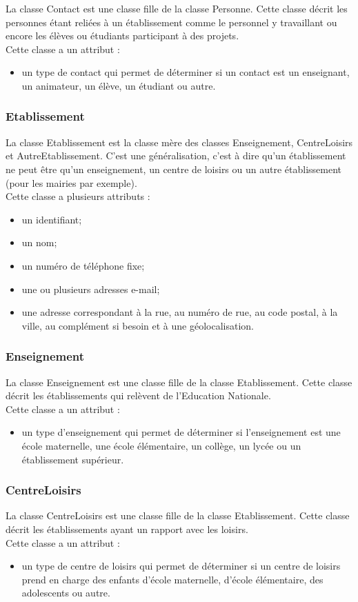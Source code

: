 La classe Contact est une classe fille de la classe Personne. Cette classe décrit les personnes étant reliées à un établissement comme le personnel y travaillant ou encore les élèves ou étudiants participant à des projets. \\
Cette classe a un attribut : 
\begin{itemize}
\item un type de contact qui permet de déterminer si un contact est un enseignant, un animateur, un élève, un étudiant ou autre.
\end{itemize} 

\subsubsection*{Etablissement}

La classe Etablissement est la classe mère des classes Enseignement, CentreLoisirs et AutreEtablissement. C'est une généralisation, c'est à dire qu'un établissement ne peut être qu'un enseignement, un centre de loisirs ou un autre établissement (pour les mairies par exemple).\\
Cette classe a plusieurs attributs : 
\begin{itemize}
\item un identifiant;
\item un nom;
\item un numéro de téléphone fixe;
\item une ou plusieurs adresses e-mail;
\item une adresse correspondant à la rue, au numéro de rue, au code postal, à la ville, au complément si besoin et à une géolocalisation.
\end{itemize}

\subsubsection*{Enseignement}
La classe Enseignement est une classe fille de la classe Etablissement. Cette classe décrit les établissements qui relèvent de l'Education Nationale. \\
Cette classe a un attribut : 
\begin{itemize}
\item un type d'enseignement qui permet de déterminer si l'enseignement est une école maternelle, une école élémentaire, un collège, un lycée ou un établissement supérieur. 
\end{itemize} 


\subsubsection*{CentreLoisirs}
La classe CentreLoisirs est une classe fille de la classe Etablissement. Cette classe décrit les établissements ayant un rapport avec les loisirs. \\
Cette classe a un attribut : 
\begin{itemize}
\item un type de centre de loisirs qui permet de déterminer si un centre de loisirs prend en charge des enfants d'école maternelle, d'école élémentaire, des adolescents ou autre.
\end{itemize}  

